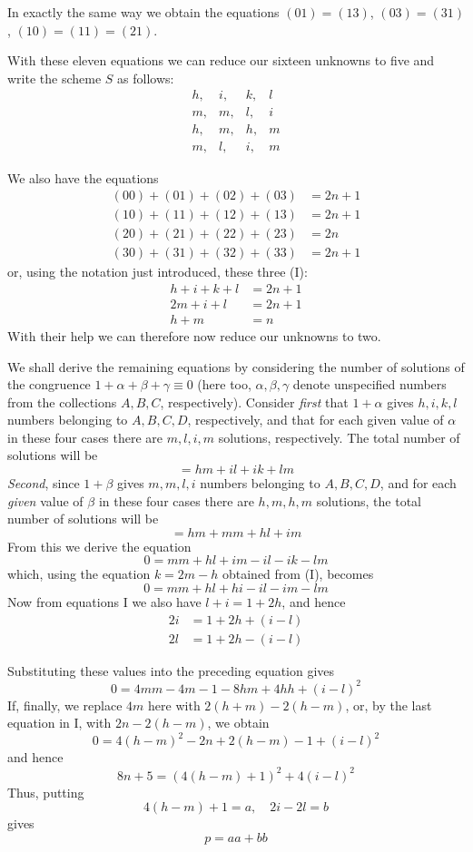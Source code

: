 In exactly the same way we obtain the equations $(01)=(13)$, $(03)=(31)$, $(10)=(11)=(21)$.

With these eleven equations we can reduce our sixteen unknowns to five and write the scheme $S$ as follows:
\[
\begin{array}{llll}
h,&i,&k,&l\\
m,&m,&l,&i\\
h,&m,&h,&m\\
m,&l,&i,&m
\end{array}
\]


%
We also have the equations
\[
\begin{aligned}
(00)+(01)+(02)+(03)&=2n+1\\
(10)+(11)+(12)+(13)&=2n+1\\
(20)+(21)+(22)+(23)&=2n\\
(30)+(31)+(32)+(33)&=2n+1
\end{aligned}
\]
or, using the notation just introduced, these three (I):
\[
\begin{aligned}
h+i+k+l&=2n+1\\
2m+i+l&=2n+1\\
h+m&=n
\end{aligned}
\]
With their help we can therefore now reduce our unknowns to two.

We shall derive the remaining equations by considering the number of solutions of the congruence $1+\alpha+\beta+\gamma\equiv0$ (here too, $\alpha,\beta,\gamma$ denote unspecified numbers from the collections $A,B,C$, respectively). Consider \emph{first} that $1+\alpha$ gives $h,i,k,l$ numbers belonging to $A,B,C,D$, respectively, and that for each given value of $\alpha$ in these four cases there are $m,l,i,m$ solutions, respectively. The total number of solutions will be
\[
=hm+il+ik+lm
\]
\emph{Second}, since $1+\beta$ gives $m,m,l,i$ numbers belonging to $A,B,C,D$, and for each \emph{given} value of $\beta$ in these four cases there are $h,m,h,m$ solutions, the total number of solutions will be
\[
=hm+mm+hl+im
\]
From this we derive the equation
\[
0=mm+hl+im-il-ik-lm
\]
which, using the equation $k=2m-h$ obtained from (I), becomes
\[
0=mm+hl+hi-il-im-lm
\]
Now from equations I we also have $l+i=1+2h$, and hence
\[
\begin{aligned}
2i&=1+2h+(i-l)\\
2l&=1+2h-(i-l)
\end{aligned}
\]

%
Substituting these values into the preceding equation gives
\[
0=4mm-4m-1-8hm+4hh+(i-l)^2
\]
If, finally, we replace $4m$ here with $2(h+m)-2(h-m)$, or, by the last equation in I, with $2n-2(h-m)$, we obtain
\[
0=4(h-m)^2-2n+2(h-m)-1+(i-l)^2
\]
and hence
\[
8n+5=(4(h-m)+1)^2+4(i-l)^2
\]
Thus, putting
\[
4(h-m)+1=a,\quad2i-2l=b
\]
gives
\[
p=aa+bb
\]

